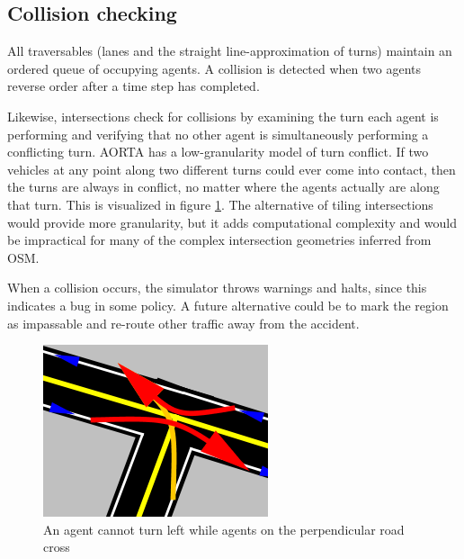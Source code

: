 \documentclass[letterpaper, 10 pt, conference]{ieeeconf}  %
\begin{document}
\subsection{Collision checking}

All traversables (lanes and the straight line-approximation of turns) maintain
an ordered queue of occupying agents. A collision is detected when two agents
reverse order after a time step has completed.

Likewise, intersections check for collisions by examining the turn each agent is
performing and verifying that no other agent is simultaneously performing a
conflicting turn. AORTA has a low-granularity model of turn conflict. If two
vehicles at any point along two different turns could ever come into contact,
then the turns are always in conflict, no matter where the agents actually are
along that turn. This is visualized in figure \ref{fig:conflicts}. The
alternative of tiling intersections \cite{JAIR08-dresner} would provide more
granularity, but it adds computational complexity and would be impractical for
many of the complex intersection geometries inferred from OSM.

When a collision occurs, the simulator throws warnings and halts, since this
indicates a bug in some policy. A future alternative could be to mark the region
as impassable and re-route other traffic away from the accident.

\begin{figure}[h]
  \centering \includegraphics[scale=0.5]{turn_conflicts.png}
  \caption{An agent cannot turn left while agents on the perpendicular road cross}
  \label{fig:conflicts}
  \vspace{-15pt}
\end{figure}
\end{document}
